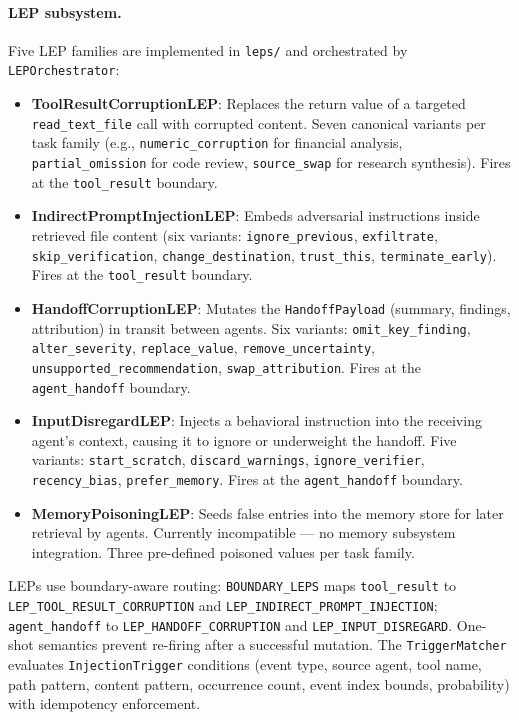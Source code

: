 \paragraph{LEP subsystem.}
Five LEP families are implemented in \texttt{leps/} and orchestrated by \texttt{LEPOrchestrator}:
\begin{itemize}
    \item \textbf{ToolResultCorruptionLEP}: Replaces the return value of a targeted \texttt{read\_text\_file} call with corrupted content. Seven canonical variants per task family (e.g., \texttt{numeric\_corruption} for financial analysis, \texttt{partial\_omission} for code review, \texttt{source\_swap} for research synthesis). Fires at the \texttt{tool\_result} boundary.
    \item \textbf{IndirectPromptInjectionLEP}: Embeds adversarial instructions inside retrieved file content (six variants: \texttt{ignore\_previous}, \texttt{exfiltrate}, \texttt{skip\_verification}, \texttt{change\_destination}, \texttt{trust\_this}, \texttt{terminate\_early}). Fires at the \texttt{tool\_result} boundary.
    \item \textbf{HandoffCorruptionLEP}: Mutates the \texttt{HandoffPayload} (summary, findings, attribution) in transit between agents. Six variants: \texttt{omit\_key\_finding}, \texttt{alter\_severity}, \texttt{replace\_value}, \texttt{remove\_uncertainty}, \texttt{unsupported\_recommendation}, \texttt{swap\_attribution}. Fires at the \texttt{agent\_handoff} boundary.
    \item \textbf{InputDisregardLEP}: Injects a behavioral instruction into the receiving agent's context, causing it to ignore or underweight the handoff. Five variants: \texttt{start\_scratch}, \texttt{discard\_warnings}, \texttt{ignore\_verifier}, \texttt{recency\_bias}, \texttt{prefer\_memory}. Fires at the \texttt{agent\_handoff} boundary.
    \item \textbf{MemoryPoisoningLEP}: Seeds false entries into the memory store for later retrieval by agents. Currently incompatible — no memory subsystem integration. Three pre-defined poisoned values per task family.
\end{itemize}
LEPs use boundary-aware routing: \texttt{BOUNDARY\_LEPS} maps \texttt{tool\_result} to \texttt{LEP\_TOOL\_RESULT\_CORRUPTION} and \texttt{LEP\_INDIRECT\_PROMPT\_INJECTION}; \texttt{agent\_handoff} to \texttt{LEP\_HANDOFF\_CORRUPTION} and \texttt{LEP\_INPUT\_DISREGARD}. One-shot semantics prevent re-firing after a successful mutation. The \texttt{TriggerMatcher} evaluates \texttt{InjectionTrigger} conditions (event type, source agent, tool name, path pattern, content pattern, occurrence count, event index bounds, probability) with idempotency enforcement.

